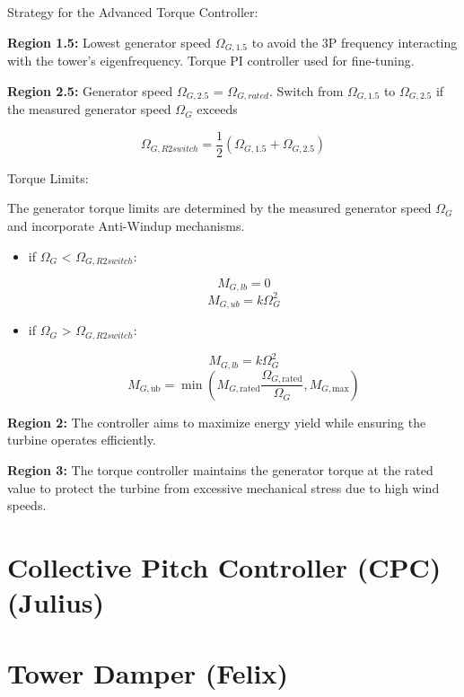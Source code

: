 Strategy for the Advanced Torque Controller:

\textbf{Region 1.5:} Lowest generator speed $\Omega_{G,1.5}$ to avoid the 3P frequency interacting with the tower's eigenfrequency. Torque PI controller used for fine-tuning.

\textbf{Region 2.5:} Generator speed $\Omega_{G,2.5}$ = $\Omega_{G,rated}$.
Switch from $\Omega_{G,1.5}$ to $\Omega_{G,2.5}$ if the measured generator speed $\Omega_{G}$ exceeds 

\begin{equation}
	\Omega_{G,R2switch} = \frac{1}{2} (\Omega_{G,1.5} + \Omega_{G,2.5})
\end{equation}

Torque Limits: 

The generator torque limits are determined by the measured generator speed $\Omega_{G}$ and incorporate Anti-Windup mechanisms.

\begin{itemize}
	
	\item if $\Omega_{G}$ < $\Omega_{G,R2switch}$:
	
	\begin{equation}
		M_{G,lb} = 0
	\end{equation}
	\begin{equation}
		M_{G,ub} = k \Omega_{G}^2
	\end{equation}
	
	\item if $\Omega_{G}$ > $\Omega_{G,R2switch}$:
	
	\begin{equation}
		M_{G,lb} = k \Omega_{G}^2
	\end{equation}
	\begin{equation} M_{G,\text{ub}} = \min\left(M_{G,\text{rated}} \frac{\Omega_{G,\text{rated}}}{\Omega_{G}}, M_{G,\text{max}}\right) \end{equation}
	
\end{itemize}


\textbf{Region 2:} The controller aims to maximize energy yield while ensuring the turbine operates efficiently.

\textbf{Region 3:} The torque controller maintains the generator torque at the rated value to protect the turbine from excessive mechanical stress due to high wind speeds.

\section{Collective Pitch Controller (CPC) (Julius)}


\section{Tower Damper (Felix)}